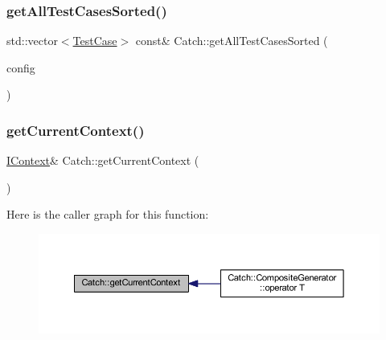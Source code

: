\hypertarget{namespace_catch_a1c9b1a23bc947ea70ddaabf067276cf2}{}\label{namespace_catch_a1c9b1a23bc947ea70ddaabf067276cf2} 
\subsubsection{\texorpdfstring{get\+All\+Test\+Cases\+Sorted()}{getAllTestCasesSorted()}}
{\footnotesize\ttfamily std\+::vector$<$\hyperlink{class_catch_1_1_test_case}{Test\+Case}$>$ const\& Catch\+::get\+All\+Test\+Cases\+Sorted (\begin{DoxyParamCaption}\item[{I\+Config const \&}]{config }\end{DoxyParamCaption})}

\hypertarget{namespace_catch_ad517cca9b21deb79101e90e5508dd161}{}\label{namespace_catch_ad517cca9b21deb79101e90e5508dd161} 
\subsubsection{\texorpdfstring{get\+Current\+Context()}{getCurrentContext()}}
{\footnotesize\ttfamily \hyperlink{struct_catch_1_1_i_context}{I\+Context}\& Catch\+::get\+Current\+Context (\begin{DoxyParamCaption}{ }\end{DoxyParamCaption})}

Here is the caller graph for this function\+:\nopagebreak
\begin{figure}[H]
\begin{center}
\leavevmode
\includegraphics[width=350pt]{namespace_catch_ad517cca9b21deb79101e90e5508dd161_icgraph}
\end{center}
\end{figure}
\hypertarget{namespace_catch_af7bb0c32ab2453d2f53e92a96d15360e}{}\label{namespace_catch_af7bb0c32ab2453d2f53e92a96d15360e} 

